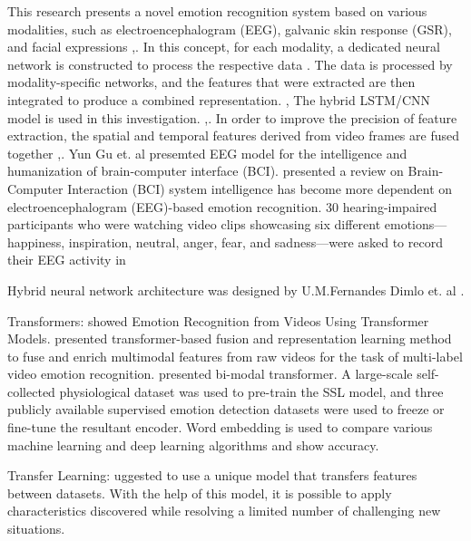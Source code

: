 \documentclass[conference]{IEEEtran}
\begin{document}
This research presents a novel emotion recognition system based on various modalities, such as electroencephalogram (EEG), galvanic skin response (GSR), and facial expressions \cite{cimtay2020cross},\cite{chowdary2022emotion}. In this concept, for each modality, a dedicated neural network is constructed to process the respective data \cite{liu2023multi}. The data is processed by modality-specific networks, and the features that were extracted are then integrated to produce a combined representation. \cite{priyadarshini2023emotion}, \cite{pan2023multimodal}
The hybrid LSTM/CNN model is used in this investigation. \cite{zhang2021multimodal},\cite{tzirakis2017end}. In order to improve the precision of feature extraction, the spatial and temporal features derived from video frames are fused together \cite{sharafi2022novel},\cite{gu2021multimodal}. Yun Gu et. al \cite{gu2023domain} presemted EEG model  for the intelligence and humanization of brain-computer interface (BCI). \cite{vempati2023systematic} presented a review on Brain-Computer Interaction (BCI) system intelligence has become more dependent on electroencephalogram (EEG)-based emotion recognition. 30 hearing-impaired participants who were watching video clips showcasing six different emotions—happiness, inspiration, neutral, anger, fear, and sadness—were asked to record their EEG activity in \cite{bai2023sect}

Hybrid neural network architecture was designed by U.M.Fernandes Dimlo et. al \cite{dimlo2023innovative}.

Transformers: \cite{nagarajan2023emotion} showed Emotion Recognition from Videos Using Transformer Models. \cite{le2023multi} presented transformer-based fusion and representation learning method to fuse and
enrich multimodal features from raw videos for the task of multi-label video emotion recognition. \cite{hsu2023applying} presented bi-modal transformer. \cite{wu2023transformer}  A large-scale self-collected physiological dataset was used to pre-train the SSL model, and three publicly available supervised emotion detection datasets were used to freeze or fine-tune the resultant encoder. \cite{kumar2023emotion} Word embedding is used to compare various machine learning and deep learning algorithms and show accuracy.

Transfer Learning: \cite{shehada2023lightweight} uggested to use a unique model that transfers features between datasets. With the help of this model, it is possible to apply characteristics discovered while resolving a limited number of challenging new situations. 
\end{document}
